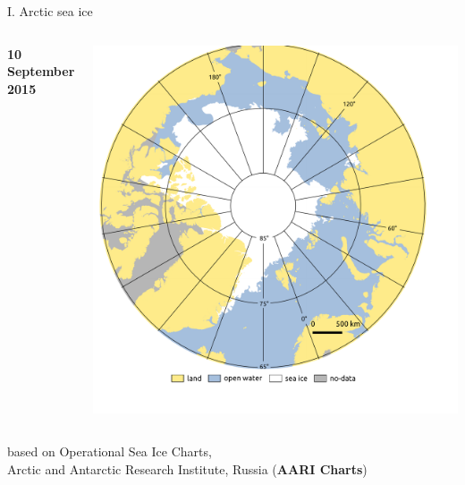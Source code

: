 \documentclass[8pt]{beamer}
\newcommand\Fontvi{\fontsize{6}{7.2}\selectfont}
\begin{document}
\begin{frame}[fragile]{I. Arctic sea ice}
\begin{columns}
		\begin{center}
			\textbf{10 September 2015}
		\end{center}
			\includegraphics[width=1\textwidth]{./img/ArcticSI_Sep2015_crop.pdf}\\
	\end{columns}
\Fontvi
based on Operational Sea Ice Charts,\\
Arctic and Antarctic Research Institute, Russia (\textbf{AARI Charts})	
\end{frame}
	
\end{document}
